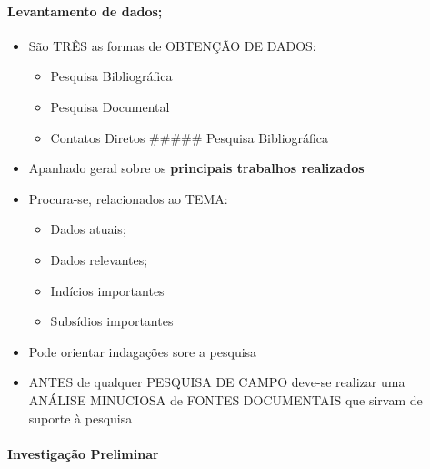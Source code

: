 \documentclass[
]{book}
\providecommand{\tightlist}{%
  \setlength{\itemsep}{0pt}\setlength{\parskip}{0pt}}
\begin{document}
\hypertarget{levantamento-de-dados}{%
\paragraph{Levantamento de dados;}\label{levantamento-de-dados}}

\begin{itemize}
\tightlist
\item
  São TRÊS as formas de OBTENÇÃO DE DADOS:

  \begin{itemize}
  \tightlist
  \item
    Pesquisa Bibliográfica
  \item
    Pesquisa Documental
  \item
    Contatos Diretos \#\#\#\#\# Pesquisa Bibliográfica
  \end{itemize}
\item
  Apanhado geral sobre os \textbf{principais trabalhos realizados}
\item
  Procura-se, relacionados ao TEMA:

  \begin{itemize}
  \tightlist
  \item
    Dados atuais;
  \item
    Dados relevantes;
  \item
    Indícios importantes
  \item
    Subsídios importantes
  \end{itemize}
\item
  Pode orientar indagações sore a pesquisa
\item
  ANTES de qualquer PESQUISA DE CAMPO deve-se realizar uma ANÁLISE
  MINUCIOSA de FONTES DOCUMENTAIS que sirvam de suporte à pesquisa
\end{itemize}

\hypertarget{investigauxe7uxe3o-preliminar}{%
\paragraph{Investigação
Preliminar}\label{investigauxe7uxe3o-preliminar}}
\end{document}
